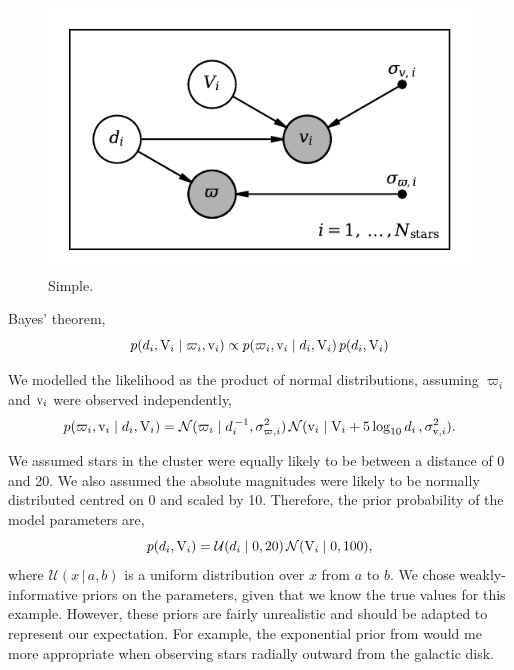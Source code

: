 \begin{figure}[tb]
    \centering
    \includegraphics{figures/simple-pgm.pdf}
    \caption{Simple.}
\end{figure}

Bayes' theorem,
%
\begin{equation}
    p(d_i, \mathrm{V}_i \mid \varpi_i, \mathrm{v}_i) \propto p(\varpi_i, \mathrm{v}_i \mid d_i, \mathrm{V}_i) \, p(d_i, \mathrm{V}_i)
\end{equation}
%

We modelled the likelihood as the product of normal distributions, assuming \(\varpi_i\) and \(\mathrm{v}_i\) were observed independently,
%
\begin{equation}
    p(\varpi_i, \mathrm{v}_i \mid d_i, \mathrm{V}_i) = \mathcal{N}(\varpi_i \mid d_i^{\,-1}, \sigma_{\varpi, i}^2) \, \mathcal{N}(\mathrm{v}_i \mid \mathrm{V}_i + 5\log_{10}d_i \, , \sigma_{\mathrm{v}, i}^2).
\end{equation}
%

We assumed stars in the cluster were equally likely to be between a distance of 0 and 20. We also assumed the absolute magnitudes were likely to be normally distributed centred on 0 and scaled by 10. Therefore, the prior probability of the model parameters are,
%
\begin{equation}
    p(d_i, \mathrm{V}_i) = \mathcal{U}(d_i \mid 0, 20) \, \mathcal{N}(\mathrm{V}_i \mid 0, 100),
\end{equation}
%
where \(\mathcal{U}(x \,|\, a, b)\) is a uniform distribution over \(x\) from \(a\) to \(b\). We chose weakly-informative priors on the parameters, given that we know the true values for this example. However, these priors are fairly unrealistic and should be adapted to represent our expectation. For example, the exponential prior from \citet{Bailer-Jones.Rybizki.ea2018} would me more appropriate when observing stars radially outward from the galactic disk.

